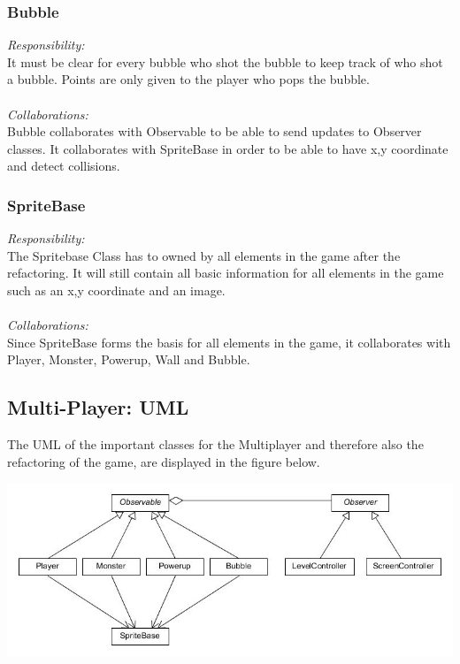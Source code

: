 \subsubsection{Bubble}
\textit{Responsibility:} \\
It must be clear for every bubble who shot the bubble to keep track of who shot a bubble. Points are only given to the player who pops the bubble. \\ \\
\textit{Collaborations:} \\
Bubble collaborates with Observable to be able to send updates to Observer classes. It collaborates with SpriteBase in order to be able to have x,y coordinate and detect collisions. 

\subsubsection{SpriteBase}
\textit{Responsibility:} \\
The Spritebase Class has to owned by all elements in the game after the refactoring. It will still contain all basic information for all elements in the game such as an x,y coordinate and an image. \\ \\
\textit{Collaborations:} \\
Since SpriteBase forms the basis for all elements in the game, it collaborates with Player, Monster, Powerup, Wall and Bubble. 

\newpage
\subsection{Multi-Player: UML}
The UML of the important classes for the Multiplayer and therefore also the refactoring of the game, are displayed in the figure below. 
\begin{center}
\includegraphics[width=\textwidth]{UML}\\[1cm]	
\end{center}

